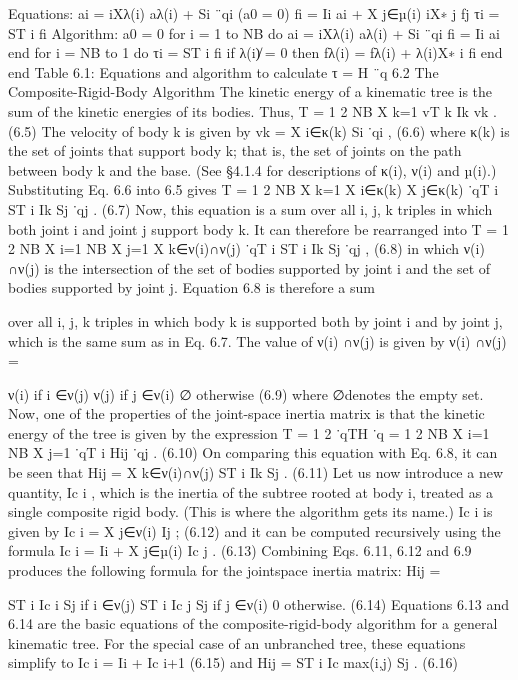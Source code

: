 Equations: ai = iXλ(i) aλ(i) + Si ¨qi (a0 = 0) fi = Ii ai + X j∈µ(i) iX∗ j fj τi = ST i fi Algorithm: a0 = 0 for i = 1 to NB do ai = iXλ(i) aλ(i) + Si ¨qi fi = Ii ai end for i = NB to 1 do τi = ST i fi if λ(i)̸ = 0 then fλ(i) = fλ(i) + λ(i)X∗ i fi end end Table 6.1: Equations and algorithm to calculate τ = H ¨q 6.2 The Composite-Rigid-Body Algorithm The kinetic energy of a kinematic tree is the sum of the kinetic energies of its bodies. Thus, T = 1 2 NB X k=1 vT k Ik vk . (6.5) The velocity of body k is given by vk = X i∈κ(k) Si ˙qi , (6.6) where κ(k) is the set of joints that support body k; that is, the set of joints on the path between body k and the base. (See §4.1.4 for descriptions of κ(i), ν(i) and µ(i).) Substituting Eq. 6.6 into 6.5 gives T = 1 2 NB X k=1 X i∈κ(k) X j∈κ(k) ˙qT i ST i Ik Sj ˙qj . (6.7) Now, this equation is a sum over all i, j, k triples in which both joint i and joint j support body k. It can therefore be rearranged into T = 1 2 NB X i=1 NB X j=1 X k∈ν(i)∩ν(j) ˙qT i ST i Ik Sj ˙qj , (6.8) in which ν(i) ∩ν(j) is the intersection of the set of bodies supported by joint i and the set of bodies supported by joint j. Equation 6.8 is therefore a sum

over all i, j, k triples in which body k is supported both by joint i and by joint j, which is the same sum as in Eq. 6.7. The value of ν(i) ∩ν(j) is given by ν(i) ∩ν(j) =

ν(i) if i ∈ν(j) ν(j) if j ∈ν(i) ∅ otherwise (6.9) where ∅denotes the empty set. Now, one of the properties of the joint-space inertia matrix is that the kinetic energy of the tree is given by the expression T = 1 2 ˙qTH ˙q = 1 2 NB X i=1 NB X j=1 ˙qT i Hij ˙qj . (6.10) On comparing this equation with Eq. 6.8, it can be seen that Hij = X k∈ν(i)∩ν(j) ST i Ik Sj . (6.11) Let us now introduce a new quantity, Ic i , which is the inertia of the subtree rooted at body i, treated as a single composite rigid body. (This is where the algorithm gets its name.) Ic i is given by Ic i = X j∈ν(i) Ij ; (6.12) and it can be computed recursively using the formula Ic i = Ii + X j∈µ(i) Ic j . (6.13) Combining Eqs. 6.11, 6.12 and 6.9 produces the following formula for the jointspace inertia matrix: Hij =

ST i Ic i Sj if i ∈ν(j) ST i Ic j Sj if j ∈ν(i) 0 otherwise. (6.14) Equations 6.13 and 6.14 are the basic equations of the composite-rigid-body algorithm for a general kinematic tree. For the special case of an unbranched tree, these equations simplify to Ic i = Ii + Ic i+1 (6.15) and Hij = ST i Ic max(i,j) Sj . (6.16)

